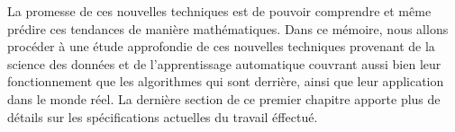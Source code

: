 La promesse de ces nouvelles techniques est de pouvoir comprendre et même prédire ces tendances de manière mathématiques. Dans ce mémoire, nous allons procéder à une étude approfondie de ces nouvelles techniques provenant de la science des données et de l'apprentissage automatique couvrant aussi bien leur fonctionnement que les algorithmes qui sont derrière, ainsi que leur application dans le monde réel. La dernière section de ce premier chapitre apporte plus de détails sur les spécifications actuelles du travail éffectué.
